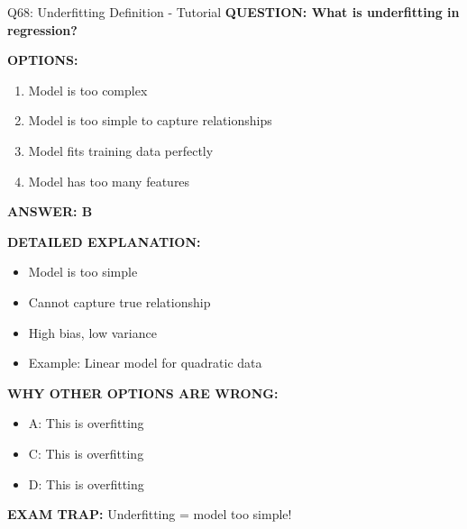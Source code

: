 \documentclass[8pt]{beamer}
\begin{document}
	\begin{frame}{Q68: Underfitting Definition - Tutorial}
		\fontsize{6.5}{7.5}\selectfont
		\textbf{QUESTION: What is underfitting in regression?}
		
		\vspace{0.1cm}
		\textbf{OPTIONS:}
		\begin{enumerate}
			\item Model is too complex
			\item Model is too simple to capture relationships
			\item Model fits training data perfectly
			\item Model has too many features
		\end{enumerate}
		
		\vspace{0.1cm}
		\textcolor{myblue}{\textbf{ANSWER: B}}
		
		\vspace{0.1cm}
		\textbf{DETAILED EXPLANATION:}
		\begin{itemize}
			\item Model is too simple
			\item Cannot capture true relationship
			\item High bias, low variance
			\item Example: Linear model for quadratic data
		\end{itemize}
		
		\vspace{0.1cm}
		\textcolor{myred}{\textbf{WHY OTHER OPTIONS ARE WRONG:}}
		\begin{itemize}
			\item \textcolor{myred}{A:} This is overfitting
			\item \textcolor{myred}{C:} This is overfitting
			\item \textcolor{myred}{D:} This is overfitting
		\end{itemize}
		
		\textcolor{myred}{\textbf{EXAM TRAP:}} Underfitting = \textcolor{myblue}{model too simple}!
	\end{frame}
	
\end{document}
